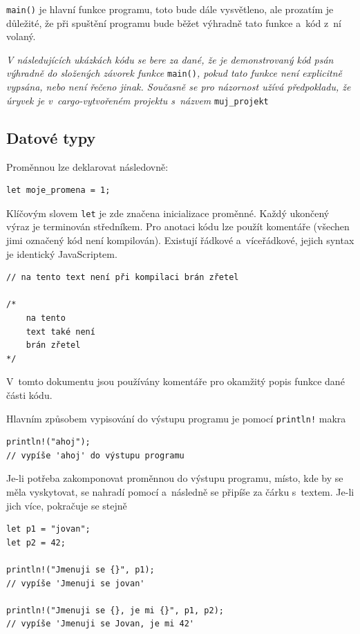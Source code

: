 \documentclass[a4paper, 12pt]{article} %
\newcommand{\rust}[1]{\texttt{#1}}
\begin{document}
		\rust{main()} je hlavní funkce programu, toto bude dále vysvětleno, ale prozatím je důležité, že při spuštění programu bude běžet výhradně tato funkce a~kód z~ní volaný.
		
		\begin{center}
			\textit{V následujících ukázkách kódu se bere za dané, že je demonstrovaný kód psán výhradně do složených závorek funkce }\rust{main()}\textit{, pokud tato funkce není explicitně vypsána, nebo není řečeno jinak. Současně se pro názornost užívá předpokladu, že úryvek je v~cargo-vytvořeném projektu s~názvem }\texttt{muj\_projekt}
		\end{center}

	\subsection{Datové typy}
		Proměnnou lze deklarovat následovně:
		\begin{verbatim}
let moje_promena = 1;
		\end{verbatim}
		
		Klíčovým slovem \rust{let} je zde značena inicializace proměnné. Každý ukončený výraz je terminován středníkem. Pro anotaci kódu lze použít komentáře (všechen jimi označený kód není kompilován). Existují řádkové a~víceřádkové, jejich syntax je identický JavaScriptem.
		\begin{verbatim}
// na tento text není při kompilaci brán zřetel

/*
	na tento
	text také není
	brán zřetel
*/
		\end{verbatim}
		
		V~tomto dokumentu jsou používány komentáře pro okamžitý popis funkce dané části kódu.

		Hlavním způsobem vypisování do výstupu programu je pomocí \rust{println!} makra
		\begin{verbatim}
println!("ahoj");
// vypíše 'ahoj' do výstupu programu
		\end{verbatim}
		
		Je-li potřeba zakomponovat proměnnou do výstupu programu, místo, kde by se měla vyskytovat, se nahradí pomocí \rust{{}} a~následně se připíše za čárku s~textem. Je-li jich více, pokračuje se stejně
		\begin{verbatim}
let p1 = "jovan";
let p2 = 42;

println!("Jmenuji se {}", p1);
// vypíše 'Jmenuji se jovan'

println!("Jmenuji se {}, je mi {}", p1, p2);
// vypíše 'Jmenuji se Jovan, je mi 42'
		\end{verbatim}
		
\end{document}
